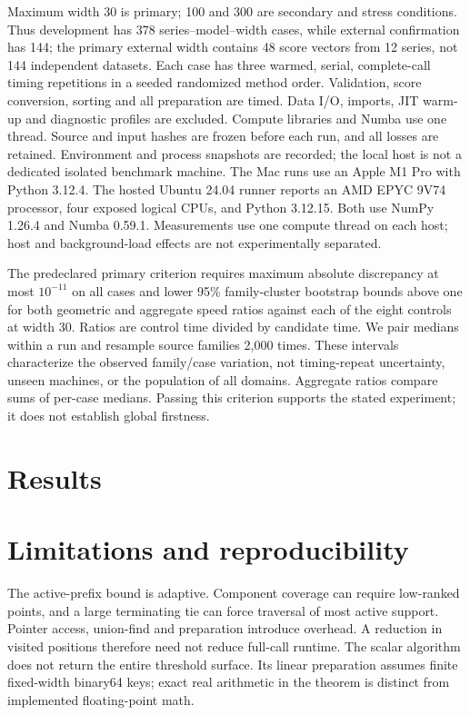 Maximum width 30 is primary; 100 and 300 are secondary and stress conditions.
Thus development has 378 series--model--width cases, while external
confirmation has 144; the primary external width contains 48 score vectors
from 12 series, not 144 independent datasets. Each case has three warmed,
serial, complete-call timing repetitions in a seeded randomized method order.
Validation, score conversion, sorting and all preparation are timed. Data I/O,
imports, JIT warm-up and diagnostic profiles are excluded. Compute libraries
and Numba use one thread. Source and input hashes are frozen before each
run, and all losses are retained. Environment and process snapshots are
recorded; the local host is not a dedicated isolated benchmark machine.
The Mac runs use an Apple M1 Pro with Python 3.12.4. The hosted Ubuntu
24.04 runner reports an AMD EPYC 9V74 processor, four exposed logical CPUs,
and Python 3.12.15. Both use NumPy 1.26.4 and Numba 0.59.1. Measurements
use one compute thread on each host; host and background-load effects are
not experimentally separated.

The predeclared primary criterion requires maximum absolute discrepancy at
most $10^{-11}$ on all cases and lower 95\% family-cluster bootstrap bounds
above one for both geometric and aggregate speed ratios against each of the
eight controls at width 30. Ratios are control time divided by candidate
time. We pair medians within a run and resample source families 2,000 times.
These intervals characterize the observed family/case variation, not
timing-repeat uncertainty, unseen machines, or the population of all domains.
Aggregate ratios compare sums of per-case medians. Passing this criterion
supports the stated experiment; it does not establish global firstness.

\section{Results}


\section{Limitations and reproducibility}
The active-prefix bound is adaptive. Component coverage can require low-ranked
points, and a large terminating tie can force traversal of most active
support. Pointer access, union-find and preparation introduce overhead. A
reduction in visited positions therefore need not reduce full-call runtime.
The scalar algorithm does not return the entire threshold surface. Its
linear preparation assumes finite fixed-width binary64 keys; exact real
arithmetic in the theorem is distinct from implemented floating-point math.

